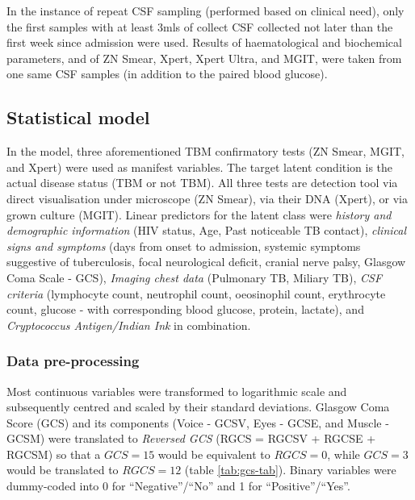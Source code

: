 \documentclass[
]{article}
\begin{document}
In the instance of repeat CSF sampling (performed based on clinical need), only the first samples with at least 3mls of collect CSF collected not later than the first week since admission were used. Results of haematological and biochemical parameters, and of ZN Smear, Xpert, Xpert Ultra, and MGIT, were taken from one same CSF samples (in addition to the paired blood glucose).

\hypertarget{statistical-model}{%
\subsection{Statistical model}\label{statistical-model}}

In the model, three aforementioned TBM confirmatory tests (ZN Smear, MGIT, and Xpert) were used as manifest variables. The target latent condition is the actual disease status (TBM or not TBM). All three tests are detection tool via direct visualisation under microscope (ZN Smear), via their DNA (Xpert), or via grown culture (MGIT). Linear predictors for the latent class were \emph{history and demographic information} (HIV status, Age, Past noticeable TB contact), \emph{clinical signs and symptoms} (days from onset to admission, systemic symptoms suggestive of tuberculosis, focal neurological deficit, cranial nerve palsy, Glasgow Coma Scale - GCS), \emph{Imaging chest data} (Pulmonary TB, Miliary TB), \emph{CSF criteria} (lymphocyte count, neutrophil count, oeosinophil count, erythrocyte count, glucose - with corresponding blood glucose, protein, lactate), and \emph{Cryptococcus Antigen/Indian Ink} in combination.

\hypertarget{data-pre-processing}{%
\subsubsection{Data pre-processing}\label{data-pre-processing}}

Most continuous variables were transformed to logarithmic scale and subsequently centred and scaled by their standard deviations. Glasgow Coma Score (GCS) and its components (Voice - GCSV, Eyes - GCSE, and Muscle - GCSM) were translated to \emph{Reversed GCS} (RGCS = RGCSV + RGCSE + RGCSM) so that a \(GCS = 15\) would be equivalent to \(RGCS = 0\), while \(GCS = 3\) would be translated to \(RGCS = 12\) (table \ref{tab:gcs-tab}). Binary variables were dummy-coded into 0 for ``Negative''/``No'' and 1 for ``Positive''/``Yes''.

\providecommand{\docline}[3]{\noalign{\global\setlength{\arrayrulewidth}{#1}}\arrayrulecolor[HTML]{#2}\cline{#3}}
\end{document}
